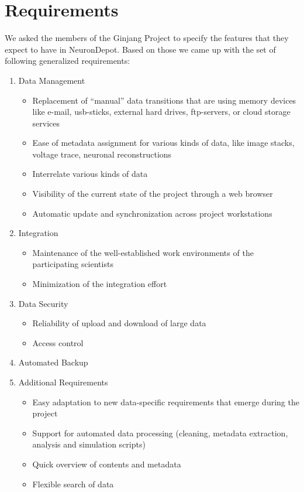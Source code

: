 \documentclass{frontiersSCNS} %
\begin{document}
\section{Requirements}
We asked the members of the Ginjang Project to specify the features that they
expect to have in  NeuronDepot. Based on those we came up with the set of
following generalized requirements:
\begin{enumerate}
\item Data Management
    \begin{itemize}
    \item Replacement of “manual” data transitions that are using memory
        devices like e-mail, usb-sticks, external hard drives, ftp-servers, or
        cloud storage services
    \item Ease of metadata assignment for various kinds of data, like image
        stacks, voltage trace, neuronal reconstructions
    \item Interrelate various kinds of data
    \item Visibility of the current state of the project through a web browser
    \item Automatic update and synchronization across project workstations
    \end{itemize}
\item Integration
    \begin{itemize}
    \item Maintenance of the well-established work environments of the participating scientists
    \item Minimization of the integration effort
    \end{itemize}
\item Data Security
    \begin{itemize}
    \item Reliability of upload and download of large data
    \item Access control
    \end{itemize}
\item Automated Backup
\item Additional Requirements
    \begin{itemize}
    \item Easy adaptation to new data-specific requirements that emerge during
        the project
    \item Support for automated data processing (cleaning, metadata extraction,
    analysis and simulation scripts)
    \item Quick overview of contents and metadata
    \item Flexible search of data
    \end{itemize}
\end{enumerate}
\end{document}
